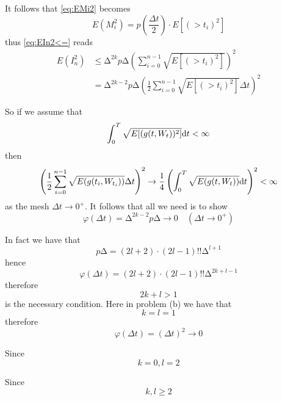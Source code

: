 \documentclass{homework}
\begin{document}
\begin{subproblem}[(\alph*)]
        It follows that \cref{eq:EMi2} becomes
        \[E(M_i^2)=p\left(\frac{\Delta t}{2}\right)
        \cdot E[(\gt{t_i})^2]\]
        thus \cref{eq:EIn2<=} reads
        \[\begin{aligned}
            E(I_n^2)&\leq
            \increment^{2k}p\increment\left(\sum_{i=0}^{n-1}
            \sqrt{E[(\gt{t_i})^2]}\right)^2\\
            &=\increment^{2k-2}p\increment
            \left(\frac12\sum_{i=0}^{n-1}\sqrt{E[(\gt{t_i})^2]}\Delta t\right)^2
        \end{aligned}\]

        So if we assume that
        \[\int_0^T\sqrt{E[(g(t,W_{t}))^2]}\mathrm d t<\infty\]
        then
        \[
            \left(\frac12\sum_{i=0}^{n-1}\sqrt{E(g(t_i,W_{t_i}))}\Delta t\right)^2
            \to
            \frac14\left(\int_0^T\sqrt{E(g(t,W_{t}))}\mathrm d t\right)^2
            <\infty
        \]
        as the mesh $\Delta t\to 0^+$.
        It follows that all we need is to show
        \[\varphi(\Delta t)=\increment^{2k-2}p\increment\to 0\quad(\Delta t\to 0^+)\]

        In fact we have that
        \[p\increment=(2l+2)\cdot(2l-1)!!\increment^{l+1}\]
        hence
        \[\varphi(\Delta t)
        =(2l+2)\cdot(2l-1)!!\increment^{2k+l-1}\]
        therefore
        \[2k+l>1\]
        is the necessary condition.
        Here in problem (b) we have that
        \[k=l=1\]
        therefore
        \[\varphi(\Delta t)=(\Delta t)^2\to 0\]

        \item
        Since
        \[k=0,l=2\]

        \item
        Since
        \[k,l\geq 2\]
        
    \end{subproblem}
\end{document}
